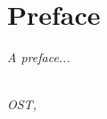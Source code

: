 \chapter*{Preface}

\emph{A preface...}

\begin{flushright}
{\makeatletter\itshape
    \@author \\
    OST, \monthname{} \the\year{}
\makeatother}
\end{flushright}
